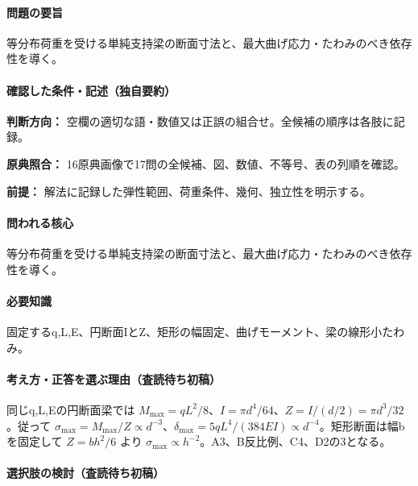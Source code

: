 \paragraph{問題の要旨} 等分布荷重を受ける単純支持梁の断面寸法と、最大曲げ応力・たわみのべき依存性を導く。

\paragraph{確認した条件・記述（独自要約）}\mbox{}\par

\noindent\textbf{判断方向：} 空欄の適切な語・数値又は正誤の組合せ。全候補の順序は各肢に記録。\par

\noindent\textbf{原典照合：} 16原典画像で17問の全候補、図、数値、不等号、表の列順を確認。\par

\noindent\textbf{前提：} 解法に記録した弾性範囲、荷重条件、幾何、独立性を明示する。\par

\paragraph{問われる核心} 等分布荷重を受ける単純支持梁の断面寸法と、最大曲げ応力・たわみのべき依存性を導く。

\paragraph{必要知識} 固定するq,L,E、円断面IとZ、矩形の幅固定、曲げモーメント、梁の線形小たわみ。

\paragraph{考え方・正答を選ぶ理由（査読待ち初稿）} 同じq,L,Eの円断面梁では \(M_{\max}=qL^2/8\)、\(I=\pi d^4/64\)、\(Z=I/(d/2)=\pi d^3/32\)。従って \(\sigma_{\max}=M_{\max}/Z\propto d^{-3}\)、\(\delta_{\max}=5qL^4/(384EI)\propto d^{-4}\)。矩形断面は幅bを固定して \(Z=bh^2/6\) より \(\sigma_{\max}\propto h^{-2}\)。A3、B反比例、C4、D2の3となる。

\paragraph{選択肢の検討（査読待ち初稿）}\mbox{}\par

